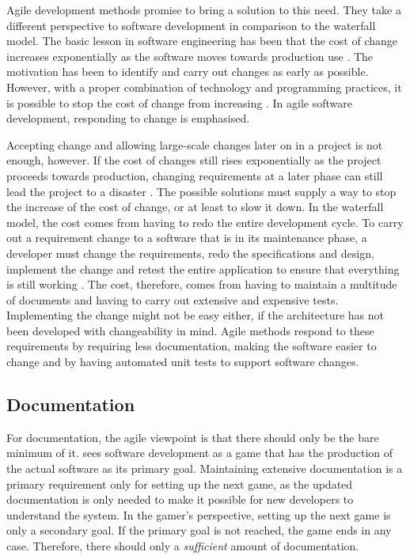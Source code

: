 Agile development methods promise to bring a solution to this need. 
They take a different perspective to software development in 
comparison to the waterfall model. The basic lesson in software 
engineering has been that the cost of change increases exponentially 
as the software moves towards production use \citep{softwareeng}. The 
motivation has been to identify and carry out changes as early as 
possible. However, with a proper combination of technology and 
programming practices, it is possible to stop the cost of change from 
increasing \citep{xpexplained}. In agile software development, 
responding to change is emphasised.

Accepting change and allowing large-scale changes later on in a 
project is not enough, however. If the cost of changes still rises 
exponentially as the project proceeds towards production, changing 
requirements at a later phase can still lead the project to a disaster 
\citep{xpexplained}. The possible solutions must supply a way to stop 
the increase of the cost of change, or at least to slow it down. In 
the waterfall model, the cost comes from having to redo the entire 
development cycle. To carry out a requirement change to a software 
that is in its maintenance phase, a developer must change the 
requirements, redo the specifications and design, implement the change 
and retest the entire application to ensure that everything is still 
working \citep{softwareeng}. The cost, therefore, comes from having to 
maintain a multitude of documents and having to carry out extensive 
and expensive tests. Implementing the change might not be easy either, 
if the architecture has not been developed with changeability in mind. 
Agile methods respond to these requirements by requiring less 
documentation, making the software easier to change and by having 
automated unit tests to support software changes.


\subsection{Documentation}
\label{toc:agile:overview:documentation}

For documentation, the agile viewpoint is that there should only be 
the bare minimum of it. \cite{agilesd} sees software development as a 
game that has the production of the actual software as its primary 
goal. Maintaining extensive documentation is a primary requirement 
only for setting up the next game, as the updated documentation is 
only needed to make it possible for new developers to understand the 
system. In the gamer's perspective, setting up the next game is only a 
secondary goal. If the primary goal is not reached, the game ends in 
any case. Therefore, there should only a \textsl{sufficient} amount of 
documentation.


